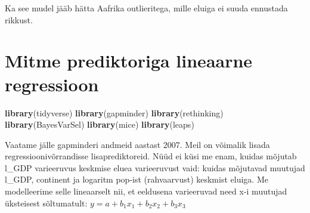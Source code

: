 \documentclass[]{book}
\newenvironment{Shaded}{\begin{snugshade}}{\end{snugshade}}
\newcommand{\KeywordTok}[1]{\textcolor[rgb]{0.13,0.29,0.53}{\textbf{#1}}}
\newcommand{\DataTypeTok}[1]{\textcolor[rgb]{0.13,0.29,0.53}{#1}}
\newcommand{\DecValTok}[1]{\textcolor[rgb]{0.00,0.00,0.81}{#1}}
\newcommand{\StringTok}[1]{\textcolor[rgb]{0.31,0.60,0.02}{#1}}
\newcommand{\OperatorTok}[1]{\textcolor[rgb]{0.81,0.36,0.00}{\textbf{#1}}}
\newcommand{\NormalTok}[1]{#1}
\begin{document}
Ka see mudel jääb hätta Aafrika outlieritega, mille eluiga ei suuda
ennustada rikkust.

\chapter{Mitme prediktoriga lineaarne
regressioon}\label{mitme-prediktoriga-lineaarne-regressioon}

\begin{Shaded}
\begin{Highlighting}[]
\KeywordTok{library}\NormalTok{(tidyverse)}
\KeywordTok{library}\NormalTok{(gapminder)}
\KeywordTok{library}\NormalTok{(rethinking)}
\KeywordTok{library}\NormalTok{(BayesVarSel)}
\KeywordTok{library}\NormalTok{(mice)}
\KeywordTok{library}\NormalTok{(leaps)}
\end{Highlighting}
\end{Shaded}

Vaatame jälle gapminderi andmeid aastast 2007. Meil on võimalik lisada
regressioonivõrrandisse lisaprediktoreid. Nüüd ei küsi me enam, kuidas
mõjutab l\_GDP varieeruvus keskmise eluea varieeruvust vaid: kuidas
mõjutavad muutujad l\_GDP, continent ja logaritm pop-ist (rahvaarvust)
keskmist eluiga. Me modelleerime selle lineaarselt nii, et eeldusena
varieeruvad need x-i muutujad üksteisest sõltumatult:
\(y = a + b_1x_1 + b_2x_2 + b_3x_3\)

\begin{Shaded}
\end{Shaded}
\end{document}

